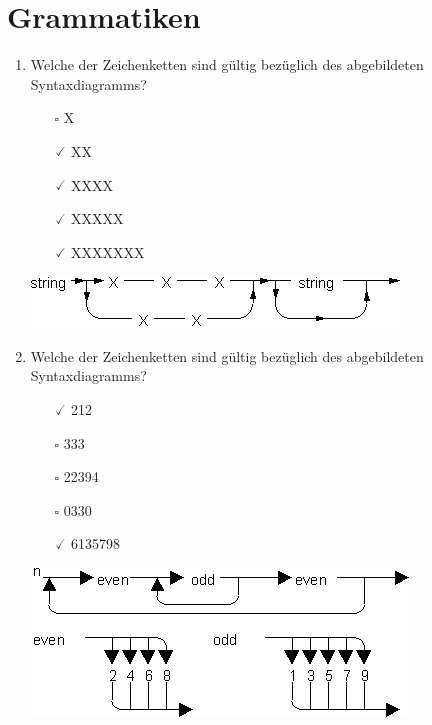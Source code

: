 \documentclass[]{article}
\begin{document}
	
	\section{Grammatiken}
	
	\begin{enumerate}
	\item Welche der Zeichenketten sind gültig bezüglich des abgebildeten Syntaxdiagramms?
	
	\begin{minipage}{0.4\linewidth}
	\begin{itemize}
		\item[$\square$] X
		\item[$\checked$] XX
		\item[$\checked$] XXXX
		\item[$\checked$] XXXXX
		\item[$\checked$] XXXXXXX
	\end{itemize}
	\end{minipage}
	\begin{minipage}{0.5\linewidth}
		\includegraphics[width=\linewidth]{figures/syntax-string.png}
	\end{minipage}
	\vspace{2ex}
	
	\item Welche der Zeichenketten sind gültig bezüglich des abgebildeten Syntaxdiagramms?
	
	\begin{minipage}{0.4\linewidth}
		\begin{itemize}
			\item[$\checked$] 212
			\item[$\square$] 333
			\item[$\square$] 22394
			\item[$\square$] 0330
			\item[$\checked$] 6135798
		\end{itemize}
	\end{minipage}
	\begin{minipage}{0.5\linewidth}
		\includegraphics[width=\linewidth]{figures/syntax-evenodd.png}
	\end{minipage}
	\vspace{2ex}


\end{enumerate}
\end{document}
